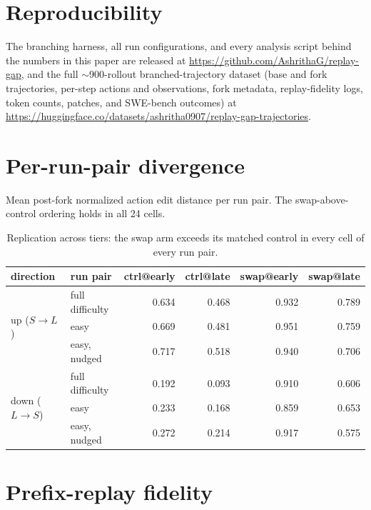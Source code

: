 \documentclass{article}
\begin{document}
\section*{Reproducibility}
The branching harness, all run configurations, and every analysis script behind the numbers in this paper are released at \url{https://github.com/AshrithaG/replay-gap}, and the full $\sim$900-rollout branched-trajectory dataset (base and fork trajectories, per-step actions and observations, fork metadata, replay-fidelity logs, token counts, patches, and SWE-bench outcomes) at \url{https://huggingface.co/datasets/ashritha0907/replay-gap-trajectories}.




\appendix

\section{Per-run-pair divergence}\label{app:perrun}

Mean post-fork normalized action edit distance per run pair. The swap-above-control ordering holds in all 24 cells.

\begin{table}[h]
\centering
\small
\begin{tabular}{llrrrr}
\toprule
direction & run pair & ctrl@early & ctrl@late & swap@early & swap@late \\
\midrule
\multirow{3}{*}{up ($S{\to}L$)}
 & full difficulty & 0.634 & 0.468 & 0.932 & 0.789 \\
 & easy            & 0.669 & 0.481 & 0.951 & 0.759 \\
 & easy, nudged    & 0.717 & 0.518 & 0.940 & 0.706 \\
\midrule
\multirow{3}{*}{down ($L{\to}S$)}
 & full difficulty & 0.192 & 0.093 & 0.910 & 0.606 \\
 & easy            & 0.233 & 0.168 & 0.859 & 0.653 \\
 & easy, nudged    & 0.272 & 0.214 & 0.917 & 0.575 \\
\bottomrule
\end{tabular}
\caption{Replication across tiers: the swap arm exceeds its matched control in every cell of every run pair.}
\label{tab:perrun}
\end{table}

\section{Prefix-replay fidelity}\label{app:fidelity}
\end{document}
